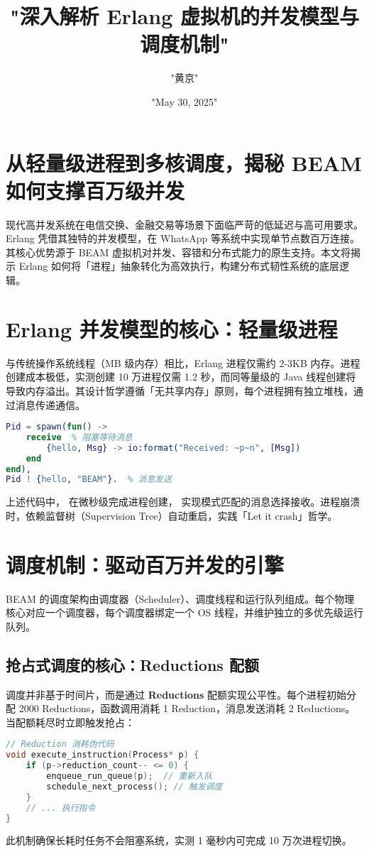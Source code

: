 \title{"深入解析 Erlang 虚拟机的并发模型与调度机制"}
\author{"黄京"}
\date{"May 30, 2025"}
\maketitle
\chapter{从轻量级进程到多核调度，揭秘 BEAM 如何支撑百万级并发}
现代高并发系统在电信交换、金融交易等场景下面临严苛的低延迟与高可用要求。Erlang 凭借其独特的并发模型，在 WhatsApp 等系统中实现单节点数百万连接。其核心优势源于 BEAM 虚拟机对并发、容错和分布式能力的原生支持。本文将揭示 Erlang 如何将「进程」抽象转化为高效执行，构建分布式韧性系统的底层逻辑。\par
\chapter{Erlang 并发模型的核心：轻量级进程}
与传统操作系统线程（MB 级内存）相比，Erlang 进程仅需约 2-3KB 内存。进程创建成本极低，实测创建 10 万进程仅需 1.2 秒，而同等量级的 Java 线程创建将导致内存溢出。其设计哲学遵循「无共享内存」原则，每个进程拥有独立堆栈，通过消息传递通信。\par
\begin{lstlisting}[language=erlang]
% 进程创建示例
Pid = spawn(fun() -> 
    receive  % 阻塞等待消息
        {hello, Msg} -> io:format("Received: ~p~n", [Msg])
    end
end),
Pid ! {hello, "BEAM"}.  % 消息发送
\end{lstlisting}
上述代码中， 在微秒级完成进程创建， 实现模式匹配的消息选择接收。进程崩溃时，依赖监督树（Supervision Tree）自动重启，实践「Let it crash」哲学。\par
\chapter{调度机制：驱动百万并发的引擎}
BEAM 的调度架构由调度器（Scheduler）、调度线程和运行队列组成。每个物理核心对应一个调度器，每个调度器绑定一个 OS 线程，并维护独立的多优先级运行队列。\par
\section{抢占式调度的核心：Reductions 配额}
调度并非基于时间片，而是通过 \textbf{Reductions} 配额实现公平性。每个进程初始分配 2000 Reductions，函数调用消耗 1 Reduction，消息发送消耗 2 Reductions。当配额耗尽时立即触发抢占：\par
\begin{lstlisting}[language=c]
// Reduction 消耗伪代码
void execute_instruction(Process* p) {
    if (p->reduction_count-- <= 0) { 
        enqueue_run_queue(p);  // 重新入队
        schedule_next_process(); // 触发调度
    }
    // ... 执行指令
}
\end{lstlisting}
此机制确保长耗时任务不会阻塞系统，实测 1 毫秒内可完成 10 万次进程切换。\par
